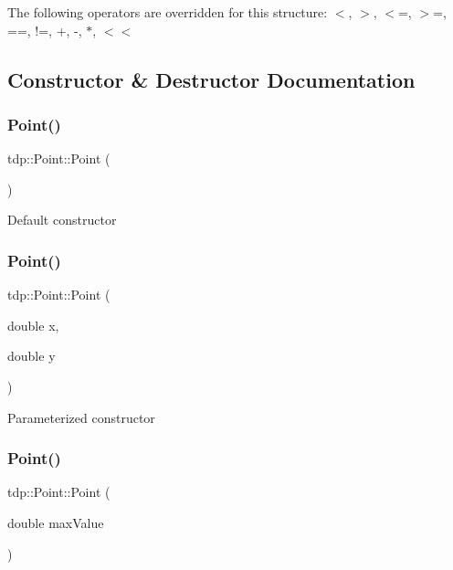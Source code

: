 The following operators are overridden for this structure\+: $<$, $>$, $<$=, $>$=, ==, !=, +, -\/, $\ast$, $<$$<$ 

\subsection{Constructor \& Destructor Documentation}
\mbox{\label{structtdp_1_1_point_a3cf3dffca0486d5b72eb8fff8f5b2f52}} 
\subsubsection{\texorpdfstring{Point()}{Point()}\hspace{0.1cm}{\footnotesize\ttfamily [1/4]}}
{\footnotesize\ttfamily tdp\+::\+Point\+::\+Point (\begin{DoxyParamCaption}{ }\end{DoxyParamCaption})}

Default constructor \mbox{\label{structtdp_1_1_point_ab713435b69e5d6cfe3704739cf2eef1e}} 
\subsubsection{\texorpdfstring{Point()}{Point()}\hspace{0.1cm}{\footnotesize\ttfamily [2/4]}}
{\footnotesize\ttfamily tdp\+::\+Point\+::\+Point (\begin{DoxyParamCaption}\item[{double}]{x,  }\item[{double}]{y }\end{DoxyParamCaption})}

Parameterized constructor \mbox{\label{structtdp_1_1_point_a37a23b239ed2dcc7b803fb851b1c4c11}} 
\subsubsection{\texorpdfstring{Point()}{Point()}\hspace{0.1cm}{\footnotesize\ttfamily [3/4]}}
{\footnotesize\ttfamily tdp\+::\+Point\+::\+Point (\begin{DoxyParamCaption}\item[{double}]{max\+Value }\end{DoxyParamCaption})}




